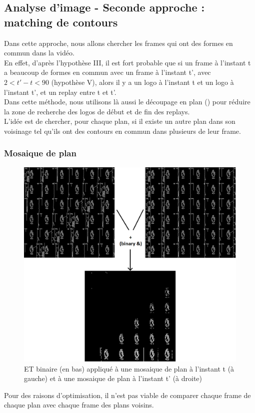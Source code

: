 \documentclass[11pt]{article}
\begin{document}
\subsection{Analyse d'image - Seconde approche : matching de contours}
\label{sec:org86ce973}
Dans cette approche, nous allons chercher les frames qui ont des formes en commun dans la vidéo.\\
En effet, d'après l'hypothèse III, il est fort probable que si un frame à l'instant t a beaucoup de formes en commun avec un frame à l'instant t', avec \(2 < t' - t < 90\) (hypothèse V), alors il y a un logo à l'instant t et un logo à l'instant t', et un replay entre t et t'.\\

Dans cette méthode, nous utilisons là aussi le découpage en plan (\cite{Abd_Almageed_2008}) pour réduire la zone de recherche des logos de début et de fin des replays.\\

L'idée est de chercher, pour chaque plan, si il existe un autre plan dans son voisinage tel qu'ils ont des contours en commun dans plusieurs de leur frame.\\


\subsubsection{Mosaique de plan}
\label{sec:orge618fb6}
\begin{figure}[htbp]
\centering
\includegraphics[width=16cm]{mosaique_add.png}
\caption{ET binaire (en bas) appliqué à une mosaique de plan à l'instant t (à gauche) et à une mosaique de plan à l'instant t' (à droite) \label{mosaic}}
\end{figure}
Pour des raisons d'optimisation, il n'est pas viable de comparer chaque frame de chaque plan avec chaque frame des plans voisins.\\
\end{document}
